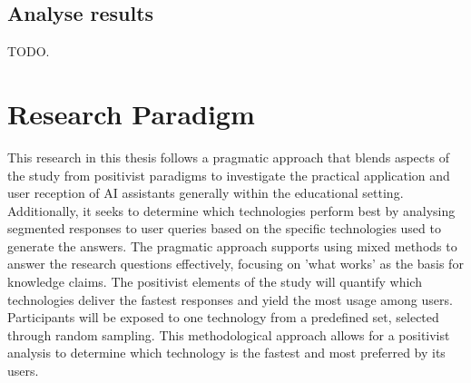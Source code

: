 \subsection{Analyse results}


TODO.












\section{Research Paradigm}
\label{sec:researchParadigm}




This research in this thesis follows a pragmatic approach that blends aspects of the study from positivist paradigms to investigate the practical application and user reception of AI assistants generally within the educational setting. Additionally, it seeks to determine which technologies perform best by analysing segmented responses to user queries based on the specific technologies used to generate the answers.
The pragmatic approach supports using mixed methods to answer the research questions effectively, focusing on 'what works' as the basis for knowledge claims. The positivist elements of the study will quantify which technologies deliver the fastest responses and yield the most usage among users. Participants will be exposed to one technology from a predefined set, selected through random sampling. This methodological approach allows for a positivist analysis to determine which technology is the fastest and most preferred by its users.


